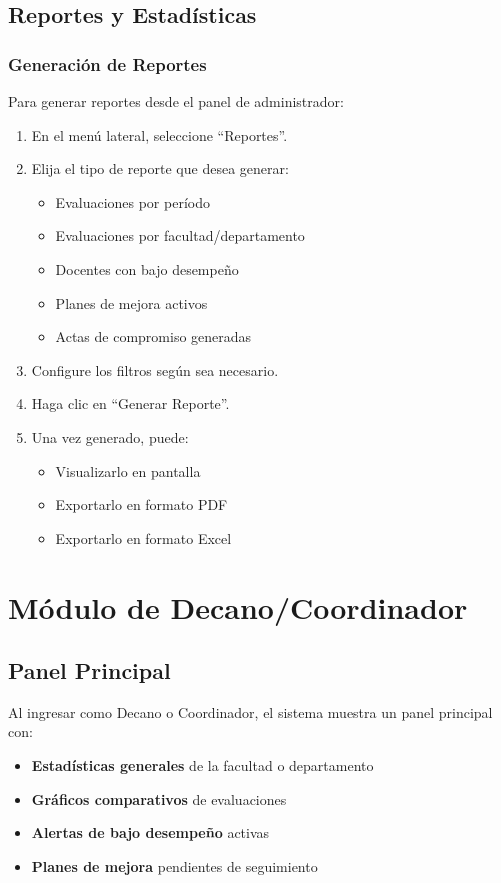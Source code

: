 \documentclass[12pt,a4paper]{book}
\begin{document}
\section{Reportes y Estadísticas}
\subsection{Generación de Reportes}
Para generar reportes desde el panel de administrador:

\begin{enumerate}
    \item En el menú lateral, seleccione ``Reportes''.
    \item Elija el tipo de reporte que desea generar:
    \begin{itemize}
        \item Evaluaciones por período
        \item Evaluaciones por facultad/departamento
        \item Docentes con bajo desempeño
        \item Planes de mejora activos
        \item Actas de compromiso generadas
    \end{itemize}
\item Configure los filtros según sea necesario.
    \item Haga clic en ``Generar Reporte''.
    \item Una vez generado, puede:
    \begin{itemize}
        \item Visualizarlo en pantalla
        \item Exportarlo en formato PDF
        \item Exportarlo en formato Excel
    \end{itemize}
\end{enumerate}

\chapter{Módulo de Decano/Coordinador}
\section{Panel Principal}
Al ingresar como Decano o Coordinador, el sistema muestra un panel principal con:

\begin{itemize}
    \item \textbf{Estadísticas generales} de la facultad o departamento
    \item \textbf{Gráficos comparativos} de evaluaciones
    \item \textbf{Alertas de bajo desempeño} activas
    \item \textbf{Planes de mejora} pendientes de seguimiento
\end{itemize}
\end{document}
